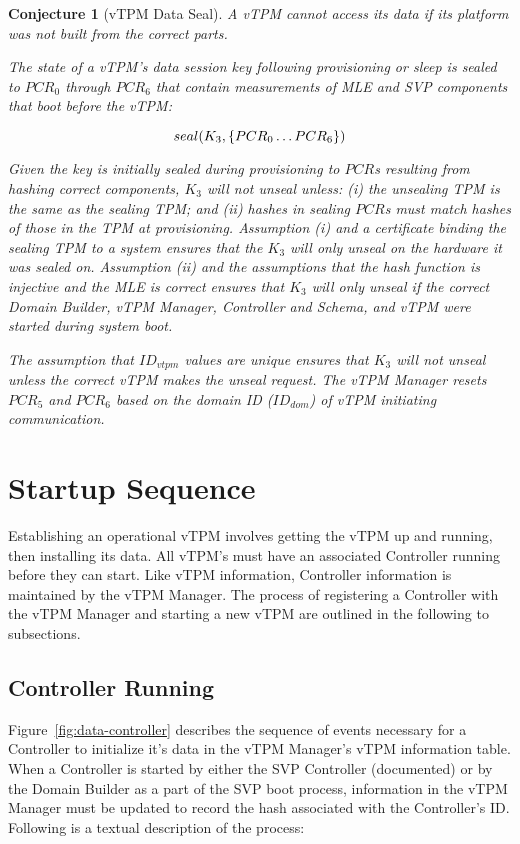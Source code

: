 \documentclass[10pt]{article}
\newtheorem{conjecture}{Conjecture}
\begin{document}
\begin{conjecture}[vTPM Data Seal]
  A vTPM cannot access its data if its platform was not built from the
  correct parts.

  The state of a vTPM's data session key following provisioning or
  sleep is sealed to $PCR_0$ through $PCR_6$ that contain measurements
  of MLE and SVP components that boot before the vTPM:

  \[seal(K_{3},\{PCR_0\ldots PCR_6\})\]

  Given the key is initially sealed during provisioning to $PCR$s
  resulting from hashing correct components, $K_{3}$ will not unseal
  unless: (i) the unsealing TPM is the same as the sealing TPM; and
  (ii) hashes in sealing $PCR$s must match hashes of those in the TPM
  at provisioning.  Assumption (i) and a certificate binding the
  sealing TPM to a system ensures that the $K_{3}$ will only unseal on
  the hardware it was sealed on.  Assumption (ii) and the assumptions
  that the hash function is injective and the MLE is correct ensures
  that $K_{3}$ will only unseal if the correct Domain Builder, vTPM
  Manager, Controller and Schema, and vTPM were started during system
  boot.

  The assumption that $ID_{vtpm}$ values are unique ensures that $K_{3}$
  will not unseal unless the correct vTPM makes the unseal request.
  The vTPM Manager resets $PCR_5$ and $PCR_6$ based on the domain ID
  ($ID_{dom}$) of vTPM initiating communication.
\end{conjecture}

\section{Startup Sequence}

Establishing an operational vTPM involves getting the vTPM up and
running, then installing its data.  All vTPM's must have an associated
Controller running before they can start.  Like vTPM information,
Controller information is maintained by the vTPM Manager.  The process
of registering a Controller with the vTPM Manager and starting a new
vTPM are outlined in the following to subsections.

\subsection{Controller Running}

Figure~\ref{fig:data-controller} describes the sequence of events
necessary for a Controller to initialize it's data in the vTPM
Manager's vTPM information table.  When a Controller is started by
either the SVP Controller (documented) or by the Domain Builder as a
part of the SVP boot process, information in the vTPM Manager must be
updated to record the hash associated with the Controller's ID.
Following is a textual description of the process:
\end{document}
